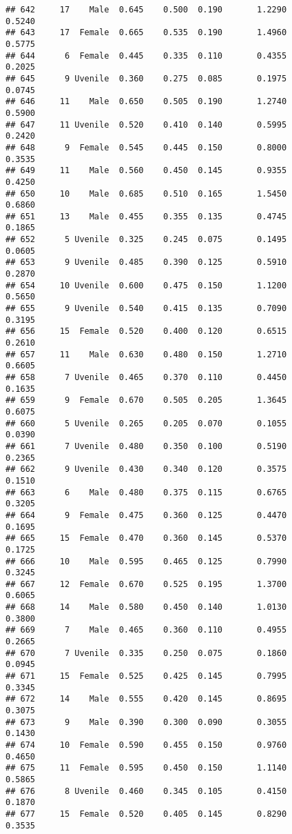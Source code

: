 \documentclass[
]{article}
\begin{document}
\begin{verbatim}
## 642     17    Male  0.645    0.500  0.190       1.2290         0.5240
## 643     17  Female  0.665    0.535  0.190       1.4960         0.5775
## 644      6  Female  0.445    0.335  0.110       0.4355         0.2025
## 645      9 Uvenile  0.360    0.275  0.085       0.1975         0.0745
## 646     11    Male  0.650    0.505  0.190       1.2740         0.5900
## 647     11 Uvenile  0.520    0.410  0.140       0.5995         0.2420
## 648      9  Female  0.545    0.445  0.150       0.8000         0.3535
## 649     11    Male  0.560    0.450  0.145       0.9355         0.4250
## 650     10    Male  0.685    0.510  0.165       1.5450         0.6860
## 651     13    Male  0.455    0.355  0.135       0.4745         0.1865
## 652      5 Uvenile  0.325    0.245  0.075       0.1495         0.0605
## 653      9 Uvenile  0.485    0.390  0.125       0.5910         0.2870
## 654     10 Uvenile  0.600    0.475  0.150       1.1200         0.5650
## 655      9 Uvenile  0.540    0.415  0.135       0.7090         0.3195
## 656     15  Female  0.520    0.400  0.120       0.6515         0.2610
## 657     11    Male  0.630    0.480  0.150       1.2710         0.6605
## 658      7 Uvenile  0.465    0.370  0.110       0.4450         0.1635
## 659      9  Female  0.670    0.505  0.205       1.3645         0.6075
## 660      5 Uvenile  0.265    0.205  0.070       0.1055         0.0390
## 661      7 Uvenile  0.480    0.350  0.100       0.5190         0.2365
## 662      9 Uvenile  0.430    0.340  0.120       0.3575         0.1510
## 663      6    Male  0.480    0.375  0.115       0.6765         0.3205
## 664      9  Female  0.475    0.360  0.125       0.4470         0.1695
## 665     15  Female  0.470    0.360  0.145       0.5370         0.1725
## 666     10    Male  0.595    0.465  0.125       0.7990         0.3245
## 667     12  Female  0.670    0.525  0.195       1.3700         0.6065
## 668     14    Male  0.580    0.450  0.140       1.0130         0.3800
## 669      7    Male  0.465    0.360  0.110       0.4955         0.2665
## 670      7 Uvenile  0.335    0.250  0.075       0.1860         0.0945
## 671     15  Female  0.525    0.425  0.145       0.7995         0.3345
## 672     14    Male  0.555    0.420  0.145       0.8695         0.3075
## 673      9    Male  0.390    0.300  0.090       0.3055         0.1430
## 674     10  Female  0.590    0.455  0.150       0.9760         0.4650
## 675     11  Female  0.595    0.450  0.150       1.1140         0.5865
## 676      8 Uvenile  0.460    0.345  0.105       0.4150         0.1870
## 677     15  Female  0.520    0.405  0.145       0.8290         0.3535

\end{verbatim}
\end{document}
